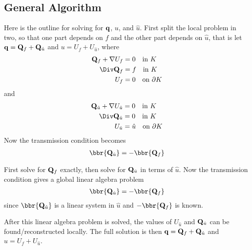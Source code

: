 \documentclass[oneside]{article}
\begin{document}
  \subsection{General Algorithm}
    Here is the outline for solving for $\mathbf{q}$, $u$, and $\hat{u}$.
    First split the local problem in two, so that one part depends on $f$ and the
    other part depends on $\hat{u}$, that is let
    $\mathbf{q} = \mathbf{Q}_f + \mathbf{Q}_{\hat{u}}$ and $u = U_f + U_{\hat{u}}$, where
    \begin{align*}
      \v{Q}_f + \nabla U_f &= 0 \quad \text{in } K \\
      \Div \v{Q}_f &= f \quad \text{in } K \\
      U_f &= 0 \quad \text{on } \partial K
    \end{align*}
    and
    \begin{align*}
      \v{Q}_{\hat{u}}+ \nabla U_{\hat{u}} &= 0 \quad \text{in } K \\
      \Div \v{Q}_{\hat{u}} &= 0 \quad \text{in } K \\
      U_{\hat{u}} &= \hat{u} \quad \text{on } \partial K
    \end{align*}
    Now the transmission condition becomes
    \begin{align*}
      \bbr{\v{Q}_{\hat{u}}} = -\bbr{\v{Q}_f}
    \end{align*}

    First solve for $\mathbf{Q}_f$ exactly, then solve for $\mathbf{Q}_{\hat{u}}$ in terms
    of $\hat{u}$.
    Now the transmission condition gives a global linear algebra problem
    \begin{align*}
      \bbr{\v{Q}_{\hat{u}}} = -\bbr{\v{Q}_f}
    \end{align*}
    since $\bbr{\v{Q}_{\hat{u}}}$ is a linear system in $\hat{u}$ and
    $-\bbr{\v{Q}_f}$ is known.

    After this linear algebra problem is solved, the values of $U_{\hat{u}}$ and
    $\mathbf{Q}_{\hat{u}}$ can be found/reconstructed locally.
    The full solution is then $\mathbf{q} = \mathbf{Q}_f + \mathbf{Q}_{\hat{u}}$ and
    $u = U_f + U_{\hat{u}}$.
\end{document}
